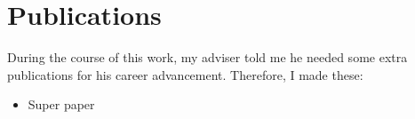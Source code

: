 \section{Publications}
\label{sec:int_publications}

During the course of this work, my adviser told me he needed some extra publications for his career advancement. Therefore, I made these:

\begin{itemize}
\item Super paper
\end{itemize}